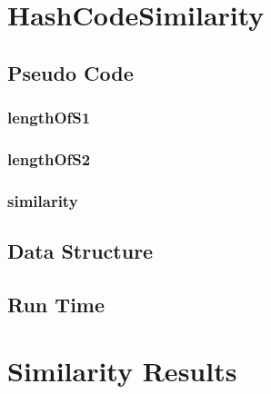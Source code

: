 \documentclass[10pt,letterpaper]{article}
\begin{document}
\section{HashCodeSimilarity}
\subsection{Pseudo Code}
\subsubsection{lengthOfS1}
\subsubsection{lengthOfS2}
\subsubsection{similarity}	
\subsection{Data Structure }
\subsection{Run Time}
\section{Similarity Results}
\end{document}
